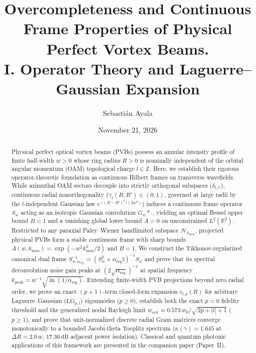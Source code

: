\documentclass[aps,pra,reprint,nofootinbib,floatfix,longbibliography]{revtex4-2}
\theoremstyle{remark}
\newcommand{\abs}[1]{\lvert #1 \rvert}
\begin{document}
\title{Overcompleteness and Continuous Frame Properties of Physical Perfect Vortex Beams.\\I. Operator Theory and Laguerre--Gaussian Expansion}

\author{Sebasti\'an Ayala}

\date{November 21, 2026}

\begin{abstract}
Physical perfect optical vortex beams (PVBs) possess an annular intensity profile of finite half-width $w > 0$ whose ring radius $R > 0$ is nominally independent of the orbital angular momentum (OAM) topological charge $l \in \mathbb{Z}$. Here, we establish their rigorous operator-theoretic foundation as continuous Hilbert frames on transverse wavefields. While azimuthal OAM sectors decouple into strictly orthogonal subspaces ($\delta_{l,l'}$), continuous radial nonorthogonality ($\gamma_l(R,R') \in (0,1)$, governed at large radii by the $l$-independent Gaussian law $e^{-(R-R')^2/(2w^2)}$) induces a continuous frame operator $S_w$ acting as an isotropic Gaussian convolution $G_w * \cdot$, yielding an optimal Bessel upper bound $B = 1$ and a vanishing global lower bound $A = 0$ on unconstrained $L^2(\mathbb{R}^2)$. Restricted to any paraxial Paley--Wiener bandlimited subspace $\mathcal{H}_{k_{\max}}$, projected physical PVBs form a stable continuous frame with sharp bounds $A(w,k_{\max}) = \exp(-w^2 k_{\max}^2/2)$ and $B = 1$. We construct the Tikhonov-regularized canonical dual frame $S_{w,\alpha_{\mathrm{reg}}}^{-1} = (S_w^2 + \alpha_{\mathrm{reg}}\mathbb{I})^{-1}S_w$ and prove that its spectral deconvolution noise gain peaks at $(2\sqrt{\alpha_{\mathrm{reg}}})^{-1}$ at spatial frequency $k_{\mathrm{peak}} = w^{-1}\sqrt{\ln(1/\alpha_{\mathrm{reg}})}$. Extending finite-width PVB projections beyond zero radial order, we prove an exact $(p+1)$-term closed-form expansion $c_{l,p}(R)$ for arbitrary Laguerre--Gaussian ($\mathrm{LG}_{p,l}$) eigenmodes ($p \ge 0$), establish both the exact $p = 0$ fidelity threshold and the generalized nodal Rayleigh limit $w_{\mathrm{crit}} \approx 0.573\,w_0/\sqrt{2p+\abs{l}+1}$ ($p \ge 1$), and prove that unit-normalized discrete radial Gram matrices converge monotonically to a bounded Jacobi-theta Toeplitz spectrum ($\kappa(\gamma) = 1.645$ at $\Delta R = 2.0\,w$, $17.36\,\mathrm{dB}$ adjacent power isolation). Classical and quantum photonic applications of this framework are presented in the companion paper (Paper~II).
\end{abstract}
\end{document}
